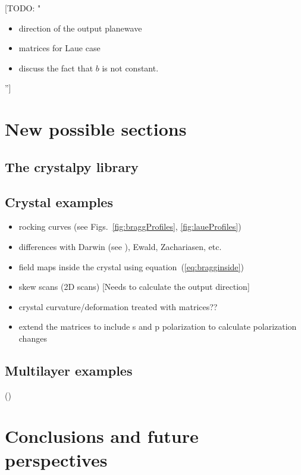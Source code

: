 \documentclass[preprint]{iucr}              %
\newcommand{\todo}[1]{{\color{red}[TODO: "#1'']}}
\newcommand{\inred}[1]{{\color{red}#1}}
\begin{document}
\newpage
\todo{
\begin{itemize}
    \item direction of the output planewave
    \item matrices for Laue case
    \item discuss the fact that $b$ is not constant.
\end{itemize}
}

%
\inred{
\section{New possible sections}
\subsection{The crystalpy library}
\subsection{Crystal examples}
\begin{itemize}
    \item rocking curves (see Figs.~\ref{fig:braggProfiles}, \ref{fig:laueProfiles})
    \item differences with Darwin (see \cite{Yashiro2000, Yashiro2001}), Ewald, Zachariasen, etc. 
    \item field maps inside the crystal using equation~(\ref{eq:bragginside})
    \item skew scans (2D scans) [Needs to calculate the output direction]
    \item crystal curvature/deformation treated with matrices??
    \item extend the matrices to include s and p polarization to calculate polarization changes
\end{itemize}

\subsection{Multilayer examples }
(\cite{Osterhoff2012, Osterhoff2013})
\section{Conclusions and future perspectives}
\label{sec:summary}

}

\end{document}
